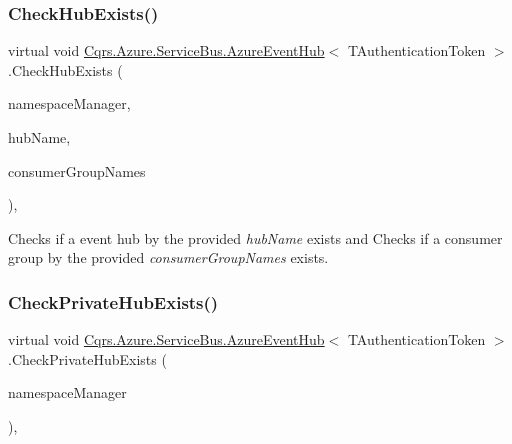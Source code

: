 \subsubsection{\texorpdfstring{Check\+Hub\+Exists()}{CheckHubExists()}}
{\footnotesize\ttfamily virtual void \hyperlink{classCqrs_1_1Azure_1_1ServiceBus_1_1AzureEventHub}{Cqrs.\+Azure.\+Service\+Bus.\+Azure\+Event\+Hub}$<$ T\+Authentication\+Token $>$.Check\+Hub\+Exists (\begin{DoxyParamCaption}\item[{Namespace\+Manager}]{namespace\+Manager,  }\item[{string}]{hub\+Name,  }\item[{string}]{consumer\+Group\+Names }\end{DoxyParamCaption})\hspace{0.3cm}{\ttfamily [protected]}, {\ttfamily [virtual]}}



Checks if a event hub by the provided {\itshape hub\+Name}  exists and Checks if a consumer group by the provided {\itshape consumer\+Group\+Names}  exists. 

\mbox{\label{classCqrs_1_1Azure_1_1ServiceBus_1_1AzureEventHub_a5eea5010c95290cb4081679538a06555_a5eea5010c95290cb4081679538a06555}} 
\subsubsection{\texorpdfstring{Check\+Private\+Hub\+Exists()}{CheckPrivateHubExists()}}
{\footnotesize\ttfamily virtual void \hyperlink{classCqrs_1_1Azure_1_1ServiceBus_1_1AzureEventHub}{Cqrs.\+Azure.\+Service\+Bus.\+Azure\+Event\+Hub}$<$ T\+Authentication\+Token $>$.Check\+Private\+Hub\+Exists (\begin{DoxyParamCaption}\item[{Namespace\+Manager}]{namespace\+Manager }\end{DoxyParamCaption})\hspace{0.3cm}{\ttfamily [protected]}, {\ttfamily [virtual]}}



